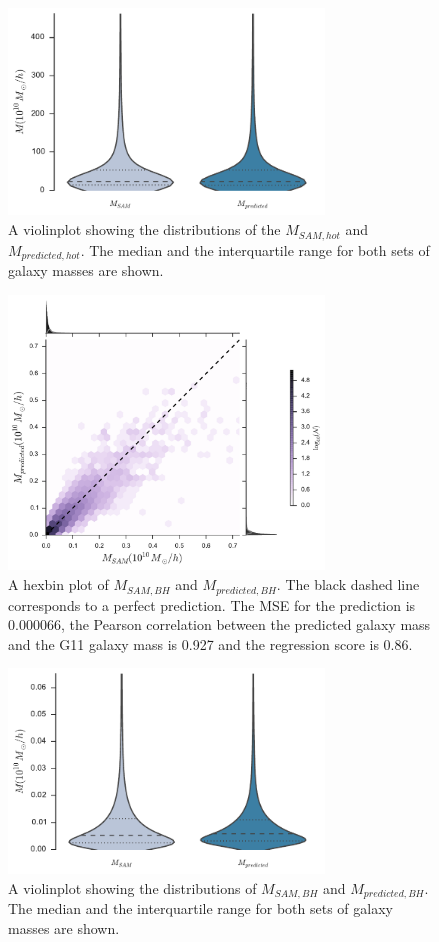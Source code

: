 \documentclass[a4paper,fleqn,usenatbib]{mnras}
\begin{document}
\begin{figure}
  \includegraphics[width=84mm]{fig7.pdf}
  \caption{A violinplot showing the distributions of the $M_{SAM,hot}$ and $M_{predicted,hot}$. The median and the interquartile range for both sets of galaxy masses are shown.}
    \label{hot2}

\end{figure}



\begin{figure}
  \includegraphics[width=84mm]{fig8.pdf}
  \caption{A hexbin plot of $M_{SAM,BH}$ and $M_{predicted,BH}$. The black dashed line corresponds to a perfect prediction. The MSE for the prediction is 0.000066, the Pearson correlation between the predicted galaxy mass and the G11 galaxy mass is 0.927 and the regression score is 0.86.}
    \label{black1}

\end{figure}

\begin{figure}
  \includegraphics[width=84mm]{fig9.pdf}
  \caption{A violinplot showing the distributions of $M_{SAM,BH}$ and $M_{predicted,BH}$. The median and the interquartile range for both sets of galaxy masses are shown.}
    \label{black2}

\end{figure}
\end{document}

